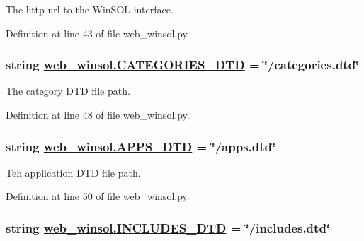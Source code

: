 The http url to the Win\-SOL interface. 



Definition at line 43 of file web\_\-winsol.py.\hypertarget{namespaceweb__winsol_2eb695d5ff57aa0a09995d8622b60efd}{
\subsubsection[CATEGORIES\_\-DTD]{\setlength{\rightskip}{0pt plus 5cm}string \hyperlink{namespaceweb__winsol_2eb695d5ff57aa0a09995d8622b60efd}{web\_\-winsol.CATEGORIES\_\-DTD} = \char`\"{}/categories.dtd\char`\"{}}}
\label{namespaceweb__winsol_2eb695d5ff57aa0a09995d8622b60efd}


The category DTD file path. 



Definition at line 48 of file web\_\-winsol.py.\hypertarget{namespaceweb__winsol_83be49c783105f474efdcf2e83370b85}{
\subsubsection[APPS\_\-DTD]{\setlength{\rightskip}{0pt plus 5cm}string \hyperlink{namespaceweb__winsol_83be49c783105f474efdcf2e83370b85}{web\_\-winsol.APPS\_\-DTD} = \char`\"{}/apps.dtd\char`\"{}}}
\label{namespaceweb__winsol_83be49c783105f474efdcf2e83370b85}


Teh application DTD file path. 



Definition at line 50 of file web\_\-winsol.py.\hypertarget{namespaceweb__winsol_85237de6fb02ee9c3fdd831318d9c73f}{
\subsubsection[INCLUDES\_\-DTD]{\setlength{\rightskip}{0pt plus 5cm}string \hyperlink{namespaceweb__winsol_85237de6fb02ee9c3fdd831318d9c73f}{web\_\-winsol.INCLUDES\_\-DTD} = \char`\"{}/includes.dtd\char`\"{}}}
\label{namespaceweb__winsol_85237de6fb02ee9c3fdd831318d9c73f}


